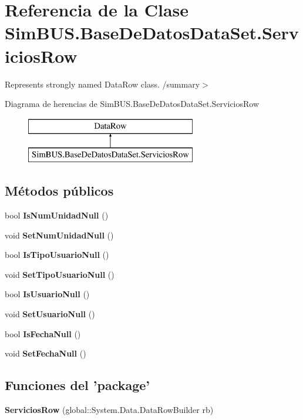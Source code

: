 \section{Referencia de la Clase Sim\-B\-U\-S.\-Base\-De\-Datos\-Data\-Set.\-Servicios\-Row}
\label{class_sim_b_u_s_1_1_base_de_datos_data_set_1_1_servicios_row}


Represents strongly named Data\-Row class. /summary$>$  


Diagrama de herencias de Sim\-B\-U\-S.\-Base\-De\-Datos\-Data\-Set.\-Servicios\-Row\begin{figure}[H]
\begin{center}
\leavevmode
\includegraphics[height=2.000000cm]{class_sim_b_u_s_1_1_base_de_datos_data_set_1_1_servicios_row}
\end{center}
\end{figure}
\subsection*{Métodos públicos}
\begin{DoxyCompactItemize}
\item 
bool {\bf Is\-Num\-Unidad\-Null} ()
\item 
void {\bf Set\-Num\-Unidad\-Null} ()
\item 
bool {\bf Is\-Tipo\-Usuario\-Null} ()
\item 
void {\bf Set\-Tipo\-Usuario\-Null} ()
\item 
bool {\bf Is\-Usuario\-Null} ()
\item 
void {\bf Set\-Usuario\-Null} ()
\item 
bool {\bf Is\-Fecha\-Null} ()
\item 
void {\bf Set\-Fecha\-Null} ()
\end{DoxyCompactItemize}
\subsection*{Funciones del 'package'}
\begin{DoxyCompactItemize}
\item 
{\bf Servicios\-Row} (global\-::\-System.\-Data.\-Data\-Row\-Builder rb)
\end{DoxyCompactItemize}
